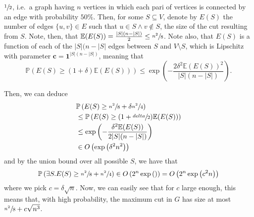 	$\sfrac{1}{2}$, i.e.\ a graph having $n$ vertices in which each pari of vertices is 
	connected by an edge with probability $50\%$. Then, for some $S \subseteq V$, denote by 
	$E(S)$ the number of edges $\{u,v\} \in E$ such that $u \in S \land v \notin S$, the size 
	of the cut resulting from $S$. Note, then, that $\mathbb{E}(E(S)) = \frac{|S|(n-|S|)}{2} 
	\leq \sfrac{n^2}{8}$. Note also, that $E(S)$ is a function of each of the $|S|(n-|S|$ edges
	between $S$ and $V \setminus S$, which is Lipschitz with parameter $\mathbf{c} = 
	\mathbf{1}^{|S|(n-|S|)}$, meaning that
	$$
		\mathbb{P}(E(S) \geq (1+\delta)\mathbb{E}(E(S))) \leq 
		\exp\left(-\frac{2\delta^2\mathbb{E}(E(S))^2}{|S|(n-|S|)}\right).
	$$

	Then, we can deduce
	\begin{align*}
		& \mathbb{P}\left(E(S) \geq \sfrac{n^2}{8} + \delta \sfrac{n^2}{4}\right) \\
		&\leq \mathbb{P}\left(E(S) \geq (1+\sfrac{delta}{2})\mathbb{E}(E(S))\right) \\
		&\leq \exp\left(-\frac{\delta^2 \mathbb{E}(E(S))}{2|S|(n-|S|)}\right) \\
		&\in O\left(\exp\left(\delta^2n^2\right)\right)
	\end{align*}
	and by the union bound over all possible $S$, we have that
	$$
		\mathbb{P}\left(\exists S . E(S) \geq \sfrac{n^2}{8} + \sfrac{n^2}{4}\right) \in
		O\left(2^n\exp\left(\right)\right) = O\left(2^n\exp\left(c^2n\right)\right)
	$$
	where we pick $c = \delta \sqrt n$. Now, we can easily see that for $c$ large enough, 
	this means that, with high probability, the maximum cut in $G$ has size at most 
	$\sfrac{n^2}{8} + c\sqrt{n^3}$.
